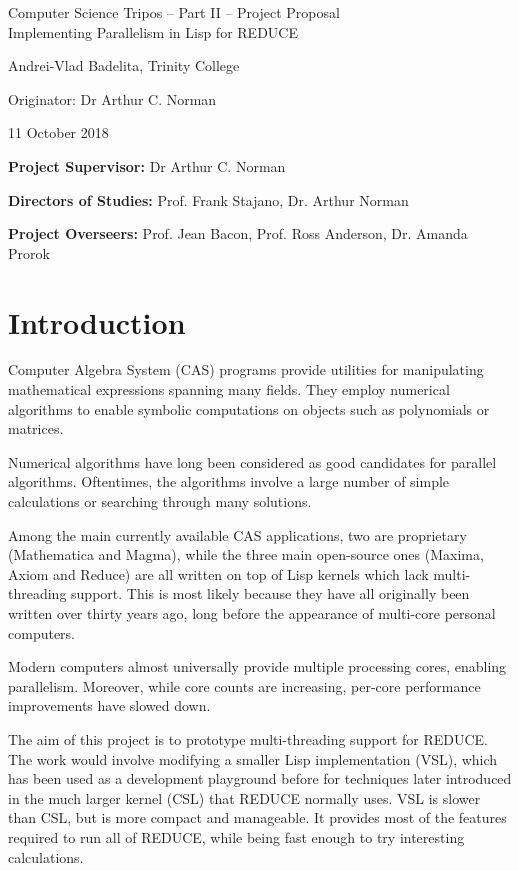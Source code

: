 \documentclass[12pt,a4paper,twoside]{article}
\begin{document}
\begin{center}
\Large
Computer Science Tripos -- Part II -- Project Proposal\\[4mm]
\LARGE
Implementing Parallelism in Lisp for REDUCE

\large
Andrei-Vlad Badelita, Trinity College

Originator: Dr Arthur C. Norman

11 October 2018
\end{center}

\vspace{5mm}

\textbf{Project Supervisor:} Dr Arthur C. Norman

\textbf{Directors of Studies:} Prof. Frank Stajano, Dr. Arthur Norman

\textbf{Project Overseers:} Prof. Jean Bacon, Prof. Ross Anderson, Dr. Amanda Prorok


\section*{Introduction}

Computer Algebra System (CAS) programs provide utilities for manipulating mathematical expressions
spanning many fields. They employ  numerical algorithms to enable symbolic computations
on objects such as polynomials or matrices.

Numerical algorithms have long been considered as good candidates for parallel algorithms.
Oftentimes, the algorithms involve a large number of simple calculations or searching through
many solutions.

Among the main currently available CAS applications, two are proprietary (Mathematica and Magma),
while the three main open-source ones (Maxima, Axiom and Reduce) are all written on top of Lisp
kernels which lack multi-threading support. This is most likely because they have all originally been
written over thirty years ago, long before the appearance of multi-core personal computers.

Modern computers almost universally provide multiple processing cores, enabling parallelism.
Moreover, while core counts are increasing, per-core performance improvements have slowed down.

The aim of this project is to prototype multi-threading support for REDUCE. The work would involve
modifying a smaller Lisp implementation (VSL), which has been used as a development playground
before for techniques later introduced in the much larger kernel (CSL) that REDUCE normally uses.
VSL is slower than CSL, but is more compact and manageable. It provides
most of the features required to run all of REDUCE, while being fast enough to try
interesting calculations.
\end{document}
